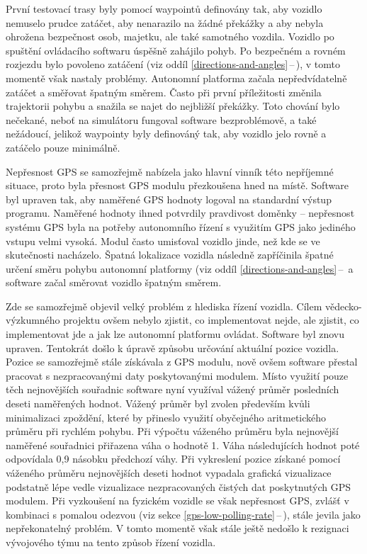 \documentclass[czech, bachelor]{diploma}
\newcommand{\filipref}[1]{\ref{#1}\,--\,\nameref{#1}}
\begin{document}
První testovací trasy byly pomocí waypointů definovány tak, aby vozidlo nemuselo prudce zatáčet, aby nenarazilo na žádné překážky
a aby nebyla ohrožena bezpečnost osob, majetku, ale také samotného vozdila. Vozidlo po spuštění ovládacího softwaru úspěšně
zahájilo pohyb. Po bezpečném a rovném rozjezdu bylo povoleno zatáčení (viz oddíl \filipref{directions-and-angles}), v tomto momentě
však nastaly problémy. Autonomní platforma začala nepředvídatelně zatáčet a směřovat špatným směrem. Často při první příležitosti
změnila trajektorii pohybu a snažila se najet do nejbližší překážky. Toto chování bylo nečekané, neboť na simulátoru fungoval
software bezproblémově, a také nežádoucí, jelikož waypointy byly definováný tak, aby vozidlo jelo rovně a zatáčelo pouze
minimálně.

Nepřesnost GPS se samozřejmě nabízela jako hlavní vinník této nepříjemné situace, proto byla přesnost GPS modulu přezkoušena hned
na místě. Software byl upraven tak, aby naměřené GPS hodnoty logoval na standardní výstup programu. Naměřené hodnoty ihned
potvrdily pravdivost doměnky -- nepřesnost systému GPS byla na potřeby autonomního řízení s využitím GPS jako jediného vstupu
velmi vysoká. Modul často umisťoval vozidlo jinde, než kde se ve skutečnosti nacházelo. Špatná lokalizace vozidla následně
zapříčinila špatné určení směru pohybu autonomní platformy (viz oddíl \filipref{directions-and-angles} a software začal směrovat
vozidlo špatným směrem.

Zde se samozřejmě objevil velký problém z hlediska řízení vozidla. Cílem vědecko-výzkumného projektu ovšem nebylo zjistit, co
implementovat nejde, ale zjistit, co implementovat jde a jak lze autonomní platformu ovládat. Software byl znovu upraven.
Tentokrát došlo k úpravě způsobu určování aktuální pozice vozidla. Pozice se samozřejmě stále získávala z GPS modulu, nově ovšem
software přestal pracovat s nezpracovanými daty poskytovanými modulem. Místo využití pouze těch nejnovějších souřadnic software
nyní využíval vážený průměr posledních deseti naměřených hodnot. Vážený průměr byl zvolen především kvůli minimalizaci zpoždění,
které by přineslo využití obyčejného aritmetického průměru při rychlém pohybu. Při výpočtu váženého průměru byla nejnovější
naměřené souřadnici přiřazena váha o hodnotě 1. Váha následujících hodnot poté odpovídala 0,9 násobku předchozí váhy.
Při vykreslení pozice získané pomocí váženého průměru nejnovějších deseti hodnot vypadala grafická vizualizace podstatně lépe
vedle vizualizace nezpracovaných čistých dat poskytnutých GPS modulem. Při vyzkoušení na fyzickém vozidle se však nepřesnost GPS,
zvlášť v kombinaci s pomalou odezvou (viz sekce \filipref{gps-low-polling-rate}), stále jevila jako nepřekonatelný problém. V tomto
momentě však stále ještě nedošlo k rezignaci vývojového týmu na tento způsob řízení vozidla.
\end{document}
